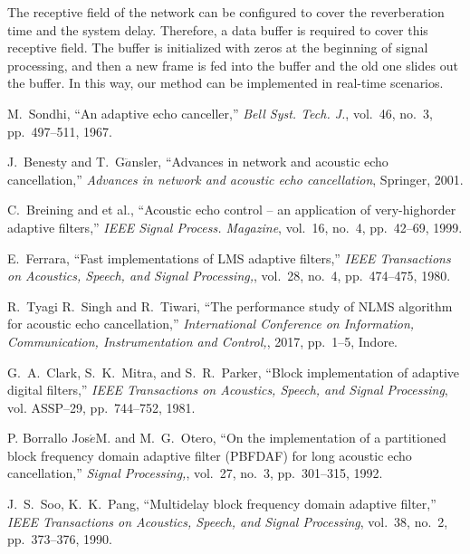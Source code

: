 \documentclass{article}
\begin{document}
\begin{sloppy}
The receptive field of the network can be configured to cover the reverberation time and the system delay. Therefore, a data buffer is required to cover this receptive field. The buffer is initialized with zeros at the beginning of signal processing, and then a new frame is fed into the buffer and the old one slides out the buffer. In this way, our method can be implemented in real-time scenarios.



%
\begin{thebibliography}{9}
   M.\ Sondhi,
   ``An adaptive echo canceller,''
   \textit{Bell Syst. Tech. J.}, vol.~46, no.~3, pp.~497--511, 1967.

   J.\ Benesty and T.\ G$\ddot{a}$nsler,
   ``Advances in network and acoustic echo cancellation,''
   \textit{Advances in network and acoustic echo cancellation}, Springer, 2001.

   C.\ Breining and et al., ``Acoustic echo control -- an application of very-highorder adaptive filters,''
   \textit{IEEE Signal Process. Magazine}, vol.~16, no.~4, pp.~42--69, 1999.

   E.\ Ferrara, ``Fast implementations of LMS adaptive filters,''
   \textit{IEEE Transactions on Acoustics, Speech, and Signal Processing,}, vol.~28, no.~4, pp.~474--475, 1980.

   R.\ Tyagi R.\ Singh and R.\ Tiwari, ``The performance study of NLMS algorithm for acoustic echo cancellation,''
   \textit{International Conference on Information, Communication, Instrumentation and Control,}, 2017, pp.~1--5, Indore.

   G.\ A.\ Clark, S.\ K.\ Mitra, and S.\ R.\ Parker, ``Block implementation of adaptive digital filters,''
   \textit{IEEE Transactions on Acoustics, Speech, and Signal Processing}, vol. ASSP--29, pp.~744--752, 1981.

   P. Borrallo Jos$\acute{e}$M. and M.\ G.\ Otero, ``On the implementation of a partitioned block frequency domain adaptive filter (PBFDAF) for long acoustic echo cancellation,''
   \textit{Signal Processing,}, vol.~27, no.~3, pp.~301--315, 1992.

   J.\ S.\ Soo, K.\ K.\ Pang, ``Multidelay block frequency domain adaptive filter,''
   \textit{IEEE Transactions on Acoustics, Speech, and Signal Processing}, vol.~38, no.~2, pp.~373--376, 1990.


\end{thebibliography}
\end{sloppy}
\end{document}
